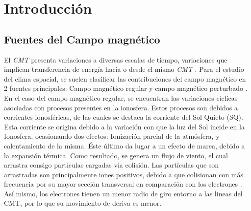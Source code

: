 \documentclass[preprint,12pt]{article}
\begin{document}





\section{Introducción}
\label{S:1}

\subsection{Fuentes del Campo magnético}
El \emph{CMT} presenta variaciones a diversas escalas de tiempo, variaciones que implican transferencia de energía hacia o desde el mismo \emph{CMT} \cite{l_handbook_geof_sw_Geom_field}. Para el estudio del clima espacial, se suelen clasificar las contribuciones del campo magnético en 2 fuentes principales: Campo magnético regular y campo magnético perturbado \cite{ddyn2005}.\\


En el caso del campo magnético regular, se encuentran las variaciones cíclicas asociadas con procesos presentes en la ionosfera. Estos procesos son debidos a corrientes ionosféricas, de las cuales se destaca la corriente del Sol Quieto (SQ). Esta corriente se origina debido a la variación con que la luz del Sol incide en la Ionosfera, ocasionando dos efectos: Ionización parcial de la atmósfera, y calentamiento de la misma. Éste último da lugar a un efecto de marea, debido a la expansión térmica. Como resultado, se genera un flujo de viento, el cual arrastra consigo partículas cargadas vía colisión. Las partículas que son arrastradas son principalmente iones positivos, debido a que colisionan con más frecuencia por su mayor sección transversal en comparación con los electrones \cite{l3, l_basic_spaceplasmaphysic}. Así mismo, los electrones tienen un menor radio de giro entorno a las lineas del CMT, por lo que su movimiento de deriva es menor.\\
\end{document}
